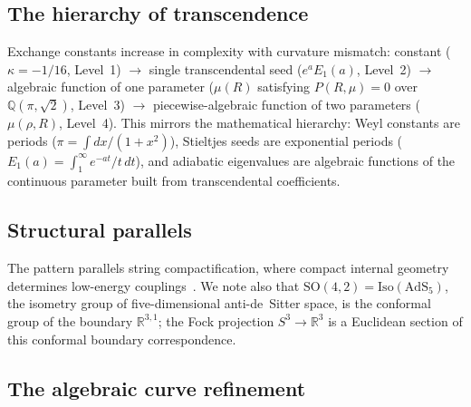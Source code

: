 \documentclass[aps,pra,twocolumn,superscriptaddress,longbibliography]{revtex4-2}
\begin{document}
\subsection{The hierarchy of transcendence}

Exchange constants increase in complexity with curvature mismatch:
constant ($\kappa = -1/16$, Level~1) $\to$ single transcendental
seed ($e^a E_1(a)$, Level~2) $\to$ algebraic function of one
parameter ($\mu(R)$ satisfying $P(R,\mu) = 0$ over
$\mathbb{Q}(\pi,\sqrt{2})$, Level~3) $\to$ piecewise-algebraic
function of two parameters ($\mu(\rho,R)$, Level~4).  This mirrors
the mathematical hierarchy: Weyl constants are periods
($\pi = \int dx/(1+x^2)$), Stieltjes seeds are exponential periods
($E_1(a) = \int_1^\infty e^{-at}/t\,dt$), and adiabatic eigenvalues
are algebraic functions of the continuous parameter built from
transcendental coefficients.


\subsection{Structural parallels}

The pattern parallels string compactification, where compact internal
geometry determines low-energy couplings~\cite{polchinski1998}.
We note also that
$\mathrm{SO}(4,2) = \mathrm{Iso}(\mathrm{AdS}_5)$, the isometry group
of five-dimensional anti-de~Sitter space, is the conformal group of the
boundary $\mathbb{R}^{3,1}$; the Fock projection
$S^3 \to \mathbb{R}^3$ is a Euclidean section of this conformal
boundary correspondence.

\subsection{The algebraic curve refinement}
\label{sec:algebraic_curve}
\end{document}
